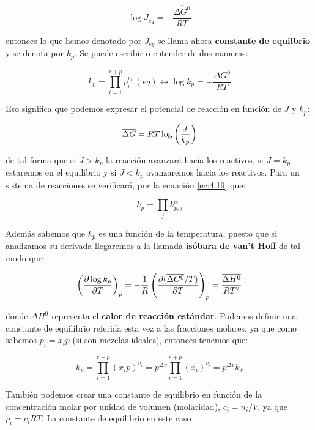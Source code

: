 \documentclass[12pt]{book}
\begin{document}
\begin{equation}
\log J_{eq} =  - \dfrac{\overline{\Delta G^0}}{RT}
\end{equation}

entonces lo que hemos denotado por $J_{eq}$ se llama ahora \textbf{constante de equilbrio} y se denota por $k_p$. Se puede escribir o entender de dos maneras:

\begin{equation}
k_p = \prod_{i=1}^{r+p} p_i^{v_i} \ (eq) \longleftrightarrow \log k_p =  - \dfrac{\overline{\Delta G^0}}{RT}
\end{equation}

Eso significa que podemos expresar el potencial de reacción en función de $J$ y $k_p$:

\begin{equation}
\overline{\Delta G} = RT \log \left( \dfrac{J}{k_p} \right)
\end{equation}

de tal forma que si $J>k_p$ la reacción avanzará hacia los reactivos, si $J=k_p$ estaremos en el equilibrio y si $J<k_p$ avanzaremos hacia los reactivos. Para un sistema de reacciones se verificará, por la ecuación \ref{ec:4.19} que:

\begin{equation}
k_{p} = \prod_j k_{p,j}^{\alpha}
\end{equation}

Además sabemos que $k_p$ es una función de la  temperatura, puesto que si analizamos su derivada llegaremos a la llamada \textbf{isóbara de van't Hoff} de tal modo que:

\begin{equation}
\left( \frac{\partial \log k_p}{\partial T} \right)_p = - \dfrac{1}{R} \left( \frac{\partial (\overline{\Delta G^0}/T)}{\partial T} \right)_p = \dfrac{\overline{\Delta H^0}}{RT^2}
\end{equation}

donde $\overline{\Delta H^0}$ representa el \textbf{calor de reacción estándar}. Podemos definir una constante de equilibrio referida esta vez a las fracciones molares, ya que como sabemos $p_i = x_i p$ (si son mezclas ideales), entonces tenemos que:

\begin{equation}
k_p = \prod_{i=1}^{r+p} (x_i p)^{v_i} = p^{\Delta v} \prod_{i=1}^{r+p} (x_i)^{v_i} = p^{\Delta v} k_x
\end{equation}

También podemos crear una constante de equilibrio en función de la concentración molar por unidad de volumen (molaridad), $c_i = n_i /V$, ya que $p_i = c_i RT$. La constante de equilibrio en este caso
\end{document}
